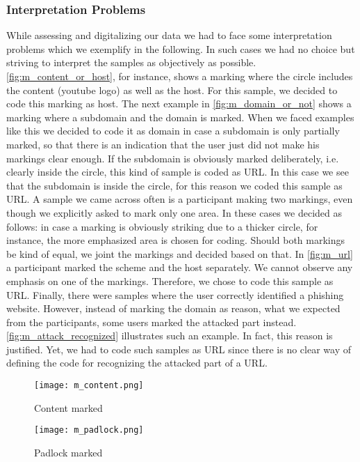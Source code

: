 \subsubsection{Interpretation Problems}
\label{s:intprobs}
While assessing and digitalizing our data we had to face some interpretation problems which we exemplify in the following.
In such cases we had no choice but striving to interpret the samples as objectively as possible.
\autoref{fig:m_content_or_host}, for instance, shows a marking where the circle includes the content (youtube logo) as well as the host. 
For this sample, we decided to code this marking as host.
The next example in \autoref{fig:m_domain_or_not} shows a marking where a subdomain and the domain is marked. 
When we faced examples like this we decided to code it as domain in case a subdomain is only partially marked, so that there is an indication that the user just did not make his markings clear enough.
If the subdomain is obviously marked deliberately, i.e. clearly inside the circle, this kind of sample is coded as URL.
In this case we see that the subdomain is inside the circle, for this reason we coded this sample as URL.
A sample we came across often is a participant making two markings, even though we explicitly asked to mark only one area.
In these cases we decided as follows: in case a marking is obviously striking due to a thicker circle, for instance, the more emphasized area is chosen for coding.
Should both markings be kind of equal, we joint the markings and decided based on that.
In \autoref{fig:m_url} a participant marked the scheme and the host separately. 
We cannot observe any emphasis on one of the markings.
Therefore, we chose to code this sample as URL.
Finally, there were samples where the user correctly identified a phishing website.
However, instead of marking the domain as reason, what we expected from the participants, some users marked the attacked part instead.
\autoref{fig:m_attack_recognized} illustrates such an example.
In fact, this reason is justified. 
Yet, we had to code such samples as URL since there is no clear way of defining the code for recognizing the attacked part of a URL.


\begin{figure}
\centering
\texttt{[image: m\_content.png]}
\caption{Content marked}
\label{fig:content}
\end{figure}

\begin{figure}
\centering
\texttt{[image: m\_padlock.png]}
\caption{Padlock marked}
\label{fig:padlock}
\end{figure}

